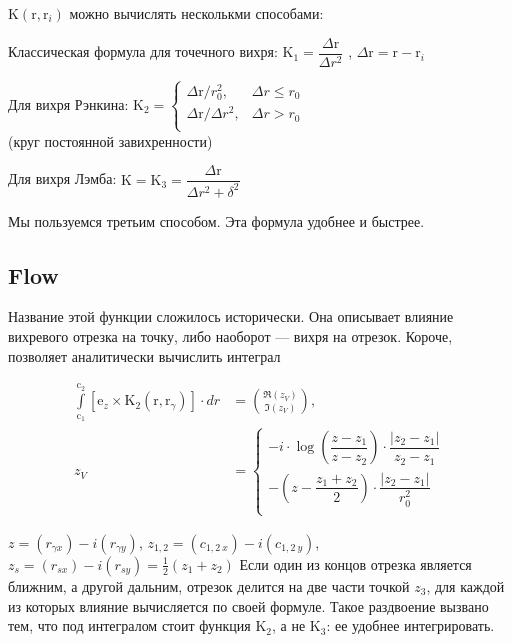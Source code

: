 \documentclass[14pt]{extreport}
\newcommand{\br}[1]{\boldsymbol{\mathrm{#1}}}
\renewcommand{\vec}[1]{\br{#1}}
\newenvironment{packed_enum}{
\begin{enumerate}
  \setlength{\itemsep}{1pt}
  \setlength{\parskip}{0pt}
  \setlength{\parsep}{0pt}
}{\end{enumerate}}
\begin{document}
$\br K (\br r, \br r_i)$ можно вычислять несколькми способами:
\begin{packed_enum}
\item Классическая формула для точечного вихря:
$\br K_1 = \dfrac {\Delta\br r}{\Delta r^2}$
, $\Delta \vec r = \vec r - \vec r_i$

\item Для вихря Рэнкина:
$\br K_2 = \begin{cases}
\Delta\br r / r_0^2,	&\Delta r \le r_0 \\
{\Delta\br r}/{\Delta r^2}, 	&\Delta r>r_0\\
\end{cases}$
\\ (круг постоянной завихренности)

\item Для вихря Лэмба:
$\br K = \br K_3 = \dfrac {\Delta\br r}{\Delta r^2 + \delta^2}$
\end{packed_enum}

Мы пользуемся третьим способом. Эта формула удобнее и быстрее.

\subsection{Flow}
\label{Flow}

Название этой функции сложилось исторически. Она описывает влияние вихревого отрезка на точку, либо наоборот --- вихря на отрезок.
Короче, позволяет аналитически вычислить интеграл

\begin{equation}
\label{eq_Flow}
\begin{split}
\int\limits_{\vec c_1}^{\vec c_2} [\vec e_z \times \vec K_2(\vec r,\vec r_\gamma)] \cdot dr &= \binom{\Re(z_V)}{\Im(z_V)}, \\
z_V &= \begin{cases}
	-i \cdot \log \left(\dfrac{z-z_1}{z-z_2}\right) \cdot \dfrac{|z_2 - z_1|}{z_2 - z_1} \\
	- \left(z - \dfrac{z_1+z_2}{2} \right) \cdot \dfrac{|z_2 - z_1|}{r_0^2} \\
\end{cases}
\end{split}
\end{equation}

$z = (r_{\gamma x}) - i (r_{\gamma y})$, $z_{1,2} = (c_{1,2~x}) - i (c_{1,2~y})$, $z_s = (r_{sx}) - i (r_{sy}) = \frac{1}{2}(z_1 + z_2)$
Если один из концов отрезка является ближним, а другой дальним, 
отрезок делится на две части точкой $z_3$, для каждой
из которых влияние вычисляется по своей формуле.
Такое раздвоение вызвано тем, что под интегралом стоит
функция $\vec K_2$, а не $\vec K_3$: ее удобнее интегрировать.
\end{document}

